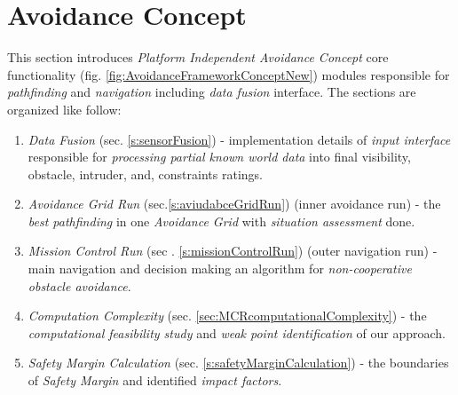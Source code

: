 \cleardoublepage
\section{Avoidance Concept}\label{s:avoidanceConcept}
\noindent This section introduces \emph{Platform Independent Avoidance Concept} core functionality (fig. \ref{fig:AvoidanceFrameworkConceptNew}) modules responsible for \emph{pathfinding} and \emph{navigation} including \emph{data fusion} interface. The sections are organized like follow:

\begin{enumerate}
    \item \emph{Data Fusion} (sec. \ref{s:sensorFusion}) - implementation details of \emph{input interface} responsible for \emph{processing partial known world data} into final visibility, obstacle, intruder, and, constraints ratings.
    
    \item \emph{Avoidance Grid Run} (sec.\ref{s:aviudabceGridRun}) (inner avoidance run) - the \emph{best pathfinding} in one \emph{Avoidance Grid} with \emph{situation assessment} done.
    
    \item \emph{Mission Control Run} (sec . \ref{s:missionControlRun}) (outer navigation run) - main navigation and decision making an algorithm for \emph{non-cooperative obstacle avoidance}.
    
    \item \emph{Computation Complexity} (sec. \ref{sec:MCRcomputationalComplexity}) - the \emph{computational feasibility study} and \emph{weak point identification} of our approach.
    
    \item \emph{Safety Margin Calculation} (sec. \ref{s:safetyMarginCalculation}) - the boundaries of \emph{Safety Margin} and identified \emph{impact factors}.
\end{enumerate}
